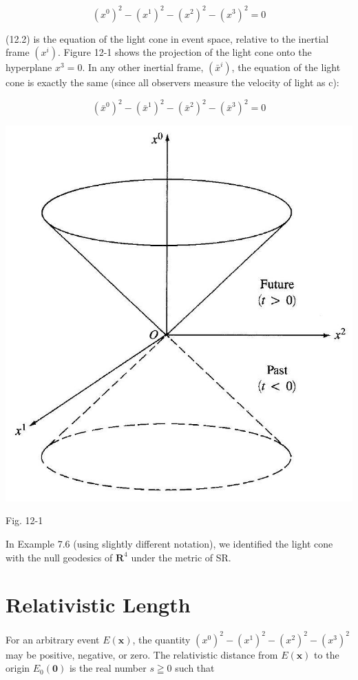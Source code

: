 \documentclass[10pt]{article}
\begin{document}
\begin{equation*}
\left(x^{0}\right)^{2}-\left(x^{1}\right)^{2}-\left(x^{2}\right)^{2}-\left(x^{3}\right)^{2}=0 \tag{12.2}
\end{equation*}


(12.2) is the equation of the light cone in event space, relative to the inertial frame $\left(x^{i}\right)$. Figure 12-1 shows the projection of the light cone onto the hyperplane $x^{3}=0$. In any other inertial frame, $\left(\bar{x}^{i}\right)$, the equation of the light cone is exactly the same (since all observers measure the velocity of light as c):

$$
\left(\bar{x}^{0}\right)^{2}-\left(\bar{x}^{1}\right)^{2}-\left(\bar{x}^{2}\right)^{2}-\left(\bar{x}^{3}\right)^{2}=0
$$

\begin{center}
\includegraphics[max width=\textwidth]{2024_04_03_41f90be4f896e21f0dc9g-174}
\end{center}

Fig. 12-1

In Example 7.6 (using slightly different notation), we identified the light cone with the null geodesics of $\mathbf{R}^{4}$ under the metric of SR.

\section*{Relativistic Length}
For an arbitrary event $E(\mathbf{x})$, the quantity $\left(x^{0}\right)^{2}-\left(x^{1}\right)^{2}-\left(x^{2}\right)^{2}-\left(x^{3}\right)^{2}$ may be positive, negative, or zero. The relativistic distance from $E(\mathbf{x})$ to the origin $E_{0}(\mathbf{0})$ is the real number $s \geqq 0$ such that
\end{document}
